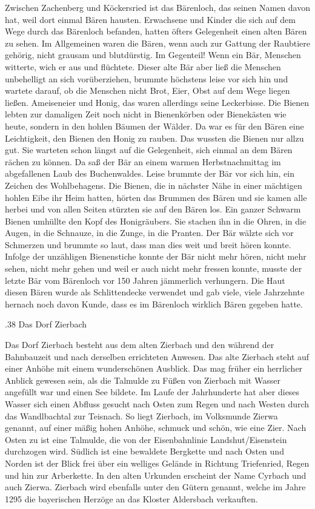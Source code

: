 \documentclass{book}
\begin{document}
Zwischen Zachenberg und Köckersried ist das Bärenloch, das seinen Namen davon
hat, weil dort einmal Bären hausten. Erwachsene und Kinder die sich auf dem Wege
durch das Bärenloch befanden, hatten öfters Gelegenheit einen alten Bären zu
sehen. Im Allgemeinen waren die Bären, wenn auch zur Gattung der Raubtiere
gehörig, nicht grausam und blutdürstig. Im Gegenteil! Wenn ein Bär, Menschen
witterte, wich er aus und flüchtete. Dieser alte Bär aber ließ die Menschen
unbehelligt an sich vorüberziehen, brummte höchstens leise vor sich hin und
wartete darauf, ob die Menschen nicht Brot, Eier, Obst auf dem Wege liegen
ließen. Ameiseneier und Honig, das waren allerdings seine Leckerbisse. Die
Bienen lebten zur damaligen Zeit noch nicht in Bienenkörben oder Bienekästen wie
heute, sondern in den hohlen Bäumen der Wälder. Da war es für den Bären eine
Leichtigkeit, den Bienen den Honig zu rauben. Das wussten die Bienen nur allzu
gut. Sie warteten schon längst auf die Gelegenheit, sich einmal an dem Bären
rächen zu können. Da saß der Bär an einem warmen Herbstnachmittag im
abgefallenen Laub des Buchenwaldes. Leise brummte der Bär vor sich hin, ein
Zeichen des Wohlbehagens. Die Bienen, die in nächster Nähe in einer mächtigen
hohlen Eibe ihr Heim hatten, hörten das Brummen des Bären und sie kamen alle
herbei und von allen Seiten stürzten sie auf den Bären los. Ein ganzer Schwarm
Bienen umhüllte den Kopf des Honigräubers. Sie stachen ihn in die Ohren, in die
Augen, in die Schnauze, in die Zunge, in die Pranten. Der Bär wälzte sich vor
Schmerzen und brummte so laut, dass man dies weit und breit hören konnte.
Infolge der unzähligen Bienenstiche konnte der Bär nicht mehr hören, nicht mehr
sehen, nicht mehr gehen und weil er auch nicht mehr fressen konnte, musste der
letzte Bär vom Bärenloch vor 150 Jahren jämmerlich verhungern. Die Haut diesen
Bären wurde als Schlittendecke verwendet und gab viele, viele Jahrzehnte hernach
noch davon Kunde, dass es im Bärenloch wirklich Bären gegeben hatte.

.38 Das Dorf Zierbach

Das Dorf Zierbach besteht aus dem alten Zierbach und den während der Bahnbauzeit
und nach derselben errichteten Anwesen. Das alte Zierbach steht auf einer Anhöhe
mit einem wunderschönen Ausblick. Das mag früher ein herrlicher Anblick gewesen
sein, als die Talmulde zu Füßen von Zierbach mit Wasser angefüllt war und einen
See bildete. Im Laufe der Jahrhunderte hat aber dieses Wasser sich einen Abfluss
gesucht nach Osten zum Regen und nach Westen durch das Wandlbachtal zur
Teisnach. So liegt Zierbach, im Volksmunde Zierwa genannt, auf einer mäßig hohen
Anhöhe, schmuck und schön, wie eine Zier. Nach Osten zu ist eine Talmulde, die
von der Eisenbahnlinie Landshut/Eisenstein durchzogen wird. Südlich ist eine
bewaldete Bergkette und nach Osten und Norden ist der Blick frei über ein
welliges Gelände in Richtung Triefenried, Regen und hin zur Arberkette. In den
alten Urkunden erscheint der Name Cyrbach und auch Zierwa. Zierbach wird
ebenfalls unter den Gütern genannt, welche im Jahre 1295 die bayerischen Herzöge
an das Kloster Aldersbach verkauften.
\end{document}
